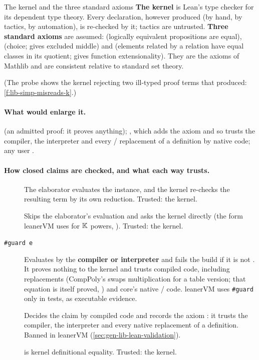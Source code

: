 \begin{define}{The kernel and the three standard axioms}
\textbf{The kernel} is Lean's type checker for its dependent type theory. Every declaration,
however produced (by hand, by tactics, by automation), is re-checked by it; tactics are
untrusted. \textbf{Three standard axioms} are assumed:  (logically equivalent
propositions are equal),  (choice; gives excluded middle) and
 (elements related by a relation have equal classes in its quotient; gives function
extensionality). They are the axioms of Mathlib and are consistent relative to standard set
theory.
\end{define}
(The probe  shows the kernel rejecting two ill-typed proof terms that
 produced: \cref{f:lib-simp-misreads-k}.)

\paragraph{What would enlarge it.}  (an admitted proof: it proves anything);
, which adds the axiom  and so trusts the compiler,
the interpreter and every / replacement of a definition
by native code; any user .

\paragraph{How closed claims are checked, and what each way trusts.}
\begin{description}
\item[] The elaborator evaluates the  instance, and the kernel
  re-checks the resulting term \allowbreak{}\allowbreak{} by its own reduction.
  Trusted: the kernel.
\item[] Skips the elaborator's evaluation and asks the kernel directly (the
  form leanerVM uses for $\mathbb{K}$ powers, \allowbreak{}). Trusted: the
  kernel.
\item[\texttt{\#guard e}] Evaluates  by the \textbf{compiler or interpreter} and fails the
  build if it is not . It proves nothing to the kernel and trusts compiled code,
  including  replacements (CompPoly's  swaps 
  multiplication for a table version; that equation is itself proved,
  \allowbreak{}) and core's native / code. leanerVM uses
  \texttt{\#guard} only in tests, as executable evidence.
\item[] Decides the claim by compiled code and records the axiom
  : it trusts the compiler, the interpreter and every native replacement
  of a definition. Banned in leanerVM (\cref{sec:gen-lib-lean-validation}).
\item[]  is kernel definitional equality. Trusted: the kernel.
\end{description}

